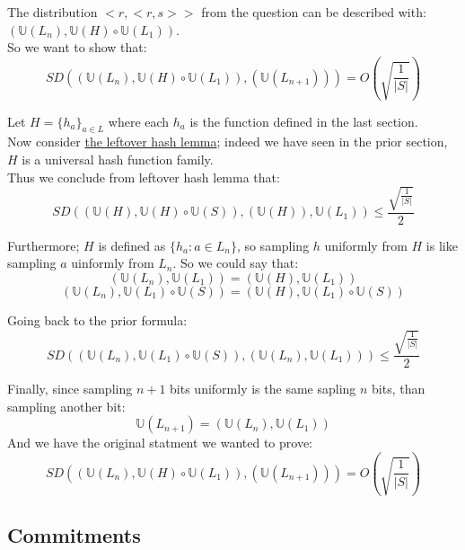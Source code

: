 The distribution $<r,<r,s>>$ from the question
can be described with: $(\mathbb{U}(L_n),\mathbb{U}(H)\circ \mathbb{U}(L_1))$.\\
So we want to show that: 
\[
	SD(
		(\mathbb{U}(L_n),\mathbb{U}(H)\circ \mathbb{U}(L_1))
		,(\mathbb{U}(L_{n+1}))
	)=O(\sqrt{\frac{1}{|S|}})
\]

Let $H=\{h_a\}_{a\in L}$ where each $h_a$ is the function 
defined in the last section.\\
Now consider \href{https://en.wikipedia.org/wiki/Leftover_hash_lemma}
{the leftover hash lemma}; indeed we have seen in the prior section,
$H$ is a universal hash function family.\\
Thus we conclude from leftover hash lemma that:
\[
	SD((\mathbb{U}(H),\mathbb{U}(H)\circ \mathbb{U}(S)), (\mathbb{U}(H)), \mathbb{U}(L_1))
	\leq\frac{\sqrt{\frac{1}{|S|}}}{2}
\]

Furthermore; $H$ is defined as $\{h_a:a\in L_n\}$, so sampling
$h$ uniformly from $H$ is like sampling $a$ uinformly from $L_n$. So we could
say that:
\[
	(\mathbb{U}(L_n),\mathbb{U}(L_1))
	=(\mathbb{U}(H),\mathbb{U}(L_1))
\]
\[
	(\mathbb{U}(L_n),\mathbb{U}(L_1)\circ \mathbb{U}(S))
	=(\mathbb{U}(H),\mathbb{U}(L_1)\circ \mathbb{U}(S))
\]

Going back to the prior formula:
\[
	SD((\mathbb{U}(L_n),\mathbb{U}(L_1)\circ \mathbb{U}(S))
	,(\mathbb{U}(L_n),\mathbb{U}(L_1)))
	\leq \frac{\sqrt{\frac{1}{|S|}}}{2}
\]

Finally, since sampling $n+1$ bits uniformly is the same
sapling $n$ bits, than sampling another bit:
\[\mathbb{U}(L_{n+1})=(\mathbb{U}(L_n), \mathbb{U}(L_1))\]
And we have the original statment we wanted to prove:
\[
	SD(
		(\mathbb{U}(L_n),\mathbb{U}(H)\circ \mathbb{U}(L_1))
		,(\mathbb{U}(L_{n+1}))
	)=O(\sqrt{\frac{1}{|S|}})
\]

\subsection{Commitments}
